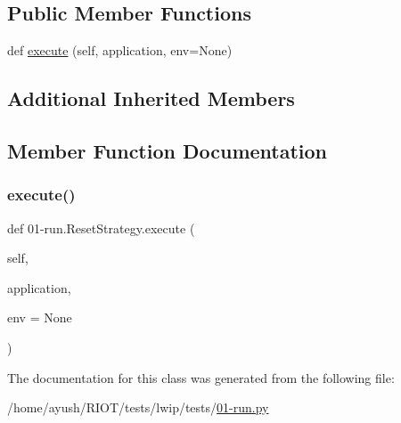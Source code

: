 \subsection*{Public Member Functions}
\begin{DoxyCompactItemize}
\item 
def \hyperlink{class01-run_1_1ResetStrategy_a936d655a041e4bea3a5a0efd807b8ad8}{execute} (self, application, env=None)
\end{DoxyCompactItemize}
\subsection*{Additional Inherited Members}


\subsection{Member Function Documentation}
\mbox{\label{class01-run_1_1ResetStrategy_a936d655a041e4bea3a5a0efd807b8ad8}} 
\subsubsection{\texorpdfstring{execute()}{execute()}}
{\footnotesize\ttfamily def 01-\/run.\+Reset\+Strategy.\+execute (\begin{DoxyParamCaption}\item[{}]{self,  }\item[{}]{application,  }\item[{}]{env = {\ttfamily None} }\end{DoxyParamCaption})}



The documentation for this class was generated from the following file\+:\begin{DoxyCompactItemize}
\item 
/home/ayush/\+R\+I\+O\+T/tests/lwip/tests/\hyperlink{lwip_2tests_201-run_8py}{01-\/run.\+py}\end{DoxyCompactItemize}
